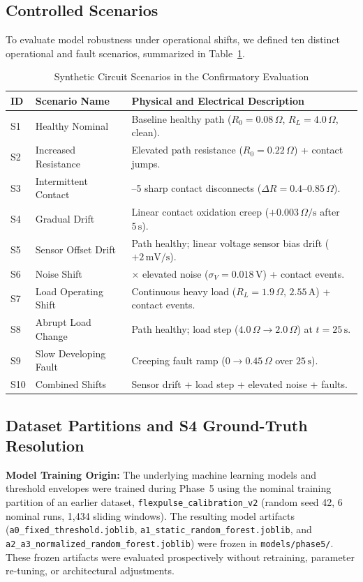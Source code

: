 \documentclass[conference]{IEEEtran}
\begin{document}
\subsection{Controlled Scenarios}
To evaluate model robustness under operational shifts, we defined ten distinct operational and fault scenarios, summarized in Table~\ref{tab:scenarios}.

\begin{table}[!t]
\caption{Synthetic Circuit Scenarios in the Confirmatory Evaluation}
\label{tab:scenarios}
\centering
\begingroup
\footnotesize
\setlength{\tabcolsep}{2.8pt}
\begin{tabularx}{\columnwidth}{@{}l>{\raggedright\arraybackslash}p{2.2cm}>{\raggedright\arraybackslash}X@{}}
\toprule
\textbf{ID} & \textbf{Scenario Name} & \textbf{Physical and Electrical Description} \\
\midrule
S1 & Healthy Nominal & Baseline healthy path ($R_0=0.08\,\Omega$, $R_L=4.0\,\Omega$, clean). \\
S2 & Increased Resistance & Elevated path resistance ($R_0=0.22\,\Omega$) + contact jumps. \\
S3 & Intermittent Contact & 3--5 sharp contact disconnects ($\Delta R=0.4$--$0.85\,\Omega$). \\
S4 & Gradual Drift & Linear contact oxidation creep ($+0.003\,\Omega/\text{s}$ after $5\,\text{s}$). \\
S5 & Sensor Offset Drift & Path healthy; linear voltage sensor bias drift ($+2\,\text{mV/s}$). \\
S6 & Noise Shift & 3$\times$ elevated noise ($\sigma_V=0.018\,\text{V}$) + contact events. \\
S7 & Load Operating Shift & Continuous heavy load ($R_L=1.9\,\Omega$, $2.55\,\text{A}$) + contact events. \\
S8 & Abrupt Load Change & Path healthy; load step ($4.0\,\Omega \to 2.0\,\Omega$) at $t=25\,\text{s}$. \\
S9 & Slow Developing Fault & Creeping fault ramp ($0 \to 0.45\,\Omega$ over $25\,\text{s}$). \\
S10 & Combined Shifts & Sensor drift + load step + elevated noise + faults. \\
\bottomrule
\end{tabularx}
\endgroup
\end{table}

\subsection{Dataset Partitions and S4 Ground-Truth Resolution}
\textbf{Model Training Origin:} The underlying machine learning models and threshold envelopes were trained during Phase~5 using the nominal training partition of an earlier dataset, \texttt{flexpulse\_calibration\_v2} (random seed 42, 6 nominal runs, 1,434 sliding windows). The resulting model artifacts (\texttt{a0\_fixed\_threshold.joblib}, \texttt{a1\_static\_random\_forest.joblib}, and \texttt{a2\_a3\_normalized\_random\_forest.joblib}) were frozen in \texttt{models/phase5/}. These frozen artifacts were evaluated prospectively without retraining, parameter re-tuning, or architectural adjustments.
\end{document}

